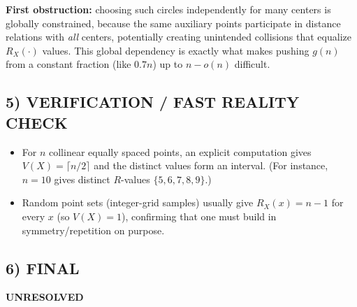 \medskip
\noindent
\textbf{First obstruction:} choosing such circles independently for many centers is globally constrained, because the same auxiliary points participate in distance relations with \emph{all} centers, potentially creating unintended collisions that equalize $R_X(\cdot)$ values.
This global dependency is exactly what makes pushing $g(n)$ from a constant fraction (like $0.7n$) up to $n-o(n)$ difficult.

\subsection*{5) VERIFICATION / FAST REALITY CHECK}

\begin{itemize}[leftmargin=2.2em]
\item For $n$ collinear equally spaced points, an explicit computation gives $V(X)=\lceil n/2\rceil$ and the distinct values form an interval.
(For instance, $n=10$ gives distinct $R$-values $\{5,6,7,8,9\}$.)
\item Random point sets (integer-grid samples) usually give $R_X(x)=n-1$ for every $x$ (so $V(X)=1$), confirming that one must build in symmetry/repetition on purpose.
\end{itemize}

\subsection*{6) FINAL}

\textbf{UNRESOLVED}

